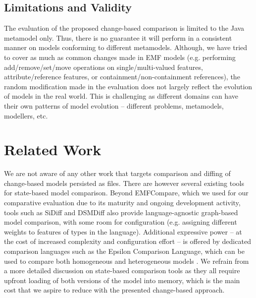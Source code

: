 \subsection{Limitations and Validity}
\label{sec:limitation_and_Threat_to_validity}
The evaluation of the proposed change-based comparison is limited to the Java metamodel only. Thus, there is no guarantee it will perform in a consistent manner on models conforming to different metamodels. Although, we have tried to cover as much as common changes made in EMF models (e.g. performing \textsf{add}/\textsf{remove}/\textsf{set}/\textsf{move} operations on \textsf{single}/\textsf{multi}-\textsf{valued} features, \textsf{attribute}/\textsf{reference} features, or \textsf{containment}/\textsf{non}-\textsf{containment} references), the random modification made in the evaluation does not largely reflect the evolution of models in the real world. This is challenging as different domains can have their own patterns of model evolution -- different problems, metamodels, modellers, etc.

\section{Related Work}
\label{sec:related_work}
We are not aware of any other work that targets comparison and diffing of change-based models persisted as files. There are however several existing tools for state-based model comparison. Beyond EMFCompare, which we used for our comparative evaluation due to its maturity and ongoing development activity, tools such as SiDiff \cite{Treude2007SiDiff} and DSMDiff \cite{lin2009dsmdiff} also provide language-agnostic graph-based model comparison, with some room for configuration (e.g. assigning different weights to features of types in the language). Additional expressive power -- at the cost of increased complexity and configuration effort -- is offered by dedicated comparison languages such as the Epsilon Comparison Language, which can be used to compare both homogeneous and heterogeneous models \cite{kolovos2009ecl}. We refrain from a more detailed discussion on state-based comparison tools as they all require upfront loading of both versions of the model into memory, which is the main cost that we aspire to reduce with the presented change-based approach.

